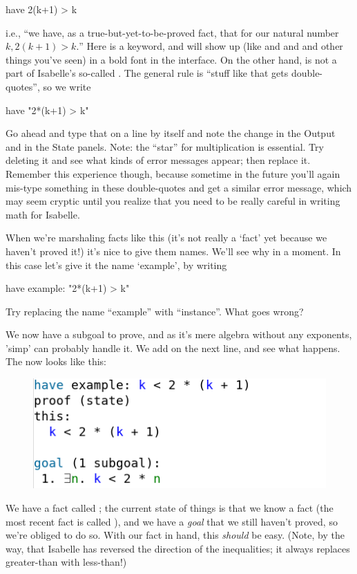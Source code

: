 \begin{IS}
have 2(k+1) > k
\end{IS}
\noindent
i.e., ``we have, as a true-but-yet-to-be-proved fact, that for our natural number $k, 2(k+1) > k.$'' Here  is a keyword, and will show up (like  and  and  and other things you've seen) in a bold font in the interface. On the other hand,  is not a part of Isabelle's so-called . The general rule is ``stuff like that gets double-quotes'', so we write
\begin{IS}
have "2*(k+1) > k"    
\end{IS}

\task Go ahead and type that on a line by itself and note the change in the Output and in the State panels. Note: the ``star'' for multiplication is essential. Try deleting it and see what kinds of error messages appear; then replace it. Remember this experience though, because sometime in the future you'll again mis-type something in these double-quotes and get a similar error message, which may seem cryptic until you realize that you need to be really careful in writing math for Isabelle.
\etask

When we're marshaling facts like this (it's not really a `fact' yet because we haven't proved it!) it's nice to give them names. We'll see why in a moment. In this case let's give it the name `example', by writing
\begin{IS}
have example: "2*(k+1) > k"    
\end{IS}

\task 
Try replacing the name ``example'' with ``instance''. What goes wrong? 
\etask

We now have a subgoal to prove, and as it's mere algebra without any exponents, 'simp' can probably handle it. We add  on the next line, and see what happens. The  now looks like this:

\begin{figure}[h]
    \includegraphics[width=0.5\linewidth]{TEXT/C01/Images/proof-state.png}
\end{figure}

We have a fact called ; the current state of things is that we know a fact (the most recent fact is called ), and we have a \textit{goal} that we still haven't proved, so we're obliged to do so. With our fact in hand, this \textit{should} be easy. (Note, by the way, that Isabelle has reversed the direction of the inequalities; it always replaces greater-than with less-than!)

